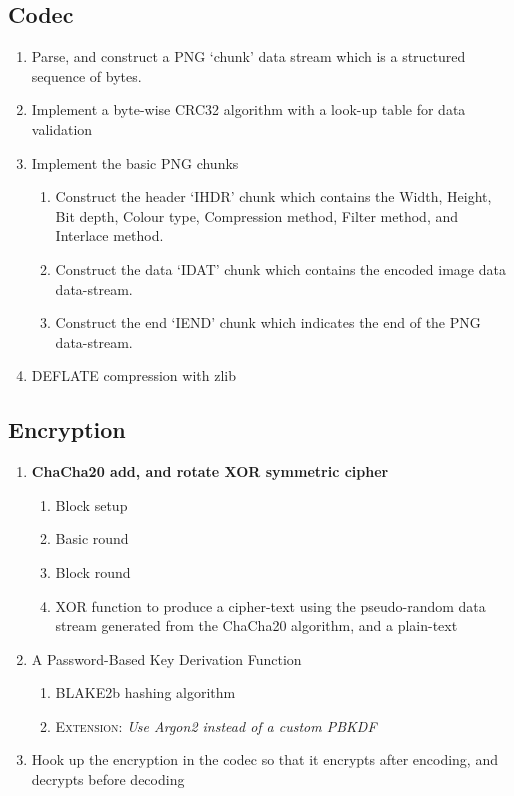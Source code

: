 \documentclass{report}
\begin{document}
\subsection{Codec}
\begin{enumerate}
    \item Parse, and construct a PNG `chunk' data stream which is a structured sequence of bytes.
    \item Implement a byte-wise CRC32 algorithm \cite{crc32} with a look-up table for data validation
    \item Implement the basic PNG chunks
    \begin{enumerate}
        \item Construct the header `IHDR' chunk which contains the Width, Height, Bit depth, Colour type, Compression method, Filter method, and Interlace method.
        \item Construct the data `IDAT' chunk which contains the encoded image data data-stream.
        \item Construct the end `IEND' chunk which indicates the end of the PNG data-stream.
    \end{enumerate}
    \item DEFLATE\cite{deflate} compression with zlib\cite{libzlib}
\end{enumerate}

\subsection{Encryption}
\begin{enumerate}
    \item \textbf{ChaCha20 add, and rotate XOR symmetric cipher}
    \begin{enumerate}
        \item Block setup
        \item Basic round
        \item Block round
        \item XOR function to produce a cipher-text using the pseudo-random data stream generated from the ChaCha20 algorithm, and a plain-text
    \end{enumerate}
    \item A Password-Based Key Derivation Function
    \begin{enumerate}        
        \item BLAKE2b hashing algorithm
        \item \textsc{Extension:} \textit{Use Argon2 instead of a custom PBKDF}
    \end{enumerate}
    \item Hook up the encryption in the codec so that it encrypts after encoding, and decrypts before decoding
\end{enumerate}
\end{document}
